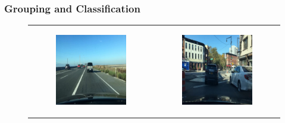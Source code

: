 \subsubsection{Grouping and Classification}
\setlength{\subfigwidth}{45mm}
\setlength{\horspace}{.3\textwidth}
\begin{figure}
    \centering
    \begin{tabular}{p{\horspace} p{\horspace}}
    \begin{subfigure}[b]{\subfigwidth}
        \includegraphics[width=\subfigwidth]{images/gpt4/s1.jpg}
    \end{subfigure}
    \hfill &
    \begin{subfigure}[b]{\subfigwidth}
        \includegraphics[width=\subfigwidth]{images/gpt4/s2.jpg}

\end{subfigure}
\end{tabular}
\end{figure}

